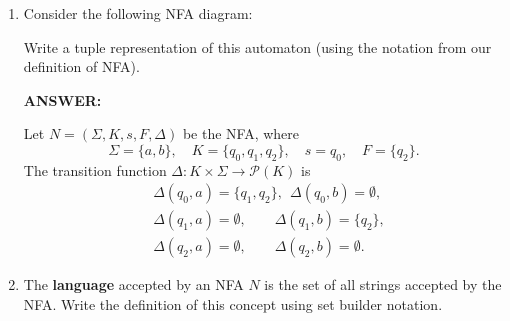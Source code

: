 \documentclass[12pt, letterpaper]{article}
\begin{document}
\begin{enumerate}
\begin{algorithm}[H]


\caption{Semantic evaluation $\mathcal{L}(R)$ of a regular expression $R$}
\end{algorithm}

\item Consider the following NFA diagram:

\begin{center}
\end{center}

Write a tuple representation of this automaton (using the notation from our definition of NFA).

\noindent\textbf{ANSWER:}

Let $N=(\Sigma,K,s,F,\Delta)$ be the NFA, where
\[
\Sigma=\{a,b\},\quad
K=\{q_0,q_1,q_2\},\quad
s=q_0,\quad
F=\{q_2\}.
\]
The transition function $\Delta:K\times\Sigma\to \mathcal{P}(K)$ is
\[
\begin{aligned}
&\Delta(q_0,a)=\{q_1,q_2\},\ \ \Delta(q_0,b)=\emptyset,\\
&\Delta(q_1,a)=\emptyset,\ \ \ \ \ \ \ \ \ \Delta(q_1,b)=\{q_2\},\\
&\Delta(q_2,a)=\emptyset,\ \ \ \ \ \ \ \ \ \Delta(q_2,b)=\emptyset.
\end{aligned}
\]

\item The \textbf{language} accepted by an NFA $N$ is the set of all strings accepted by the NFA. Write the definition of this concept using set builder notation.


\end{enumerate}
\end{document}
